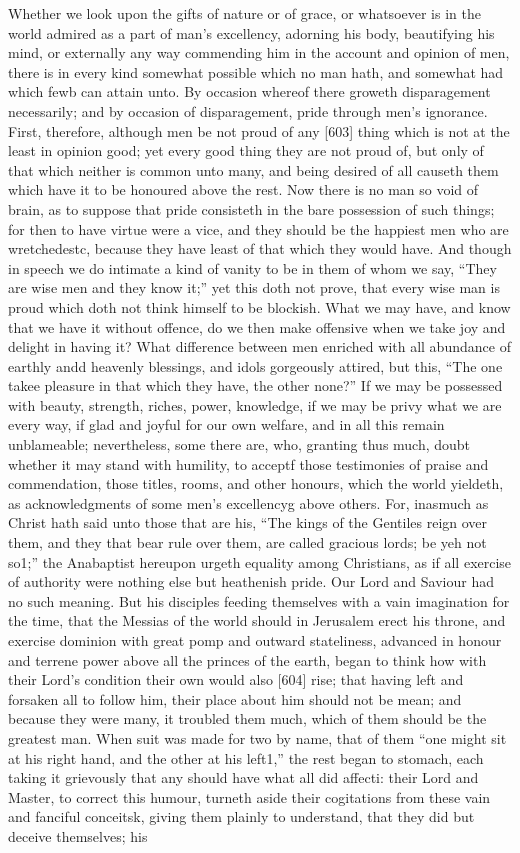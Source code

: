 Whether we look upon the gifts of nature or of grace, or whatsoever is in the world admired as a part of man’s excellency, adorning his body, beautifying his mind, or externally any way commending him in the account and opinion of men, there is in every kind somewhat possible which no man hath, and somewhat had which fewb can attain unto. By occasion whereof there groweth disparagement necessarily; and by occasion of disparagement, pride through men’s ignorance. First, therefore, although men be not proud of any [603] thing which is not at the least in opinion good; yet every good thing they are not proud of, but only of that which neither is common unto many, and being desired of all causeth them which have it to be honoured above the rest. Now there is no man so void of brain, as to suppose that pride consisteth in the bare possession of such things; for then to have virtue were a vice, and they should be the happiest men who are wretchedestc, because they have least of that which they would have. And though in speech we do intimate a kind of vanity to be in them of whom we say, “They are wise men and they know it;” yet this doth not prove, that every wise man is proud which doth not think himself to be blockish. What we may have, and know that we have it without offence, do we then make offensive when we take joy and delight in having it? What difference between men enriched with all abundance of earthly andd heavenly blessings, and idols gorgeously attired, but this, “The one takee pleasure in that which they have, the other none?” If we may be possessed with beauty, strength, riches, power, knowledge, if we may be privy what we are every way, if glad and joyful for our own welfare, and in all this remain unblameable; nevertheless, some there are, who, granting thus much, doubt whether it may stand with humility, to acceptf those testimonies of praise and commendation, those titles, rooms, and other honours, which the world yieldeth, as acknowledgments of some men’s excellencyg above others. For, inasmuch as Christ hath said unto those that are his, “The kings of the Gentiles reign over them, and they that bear rule over them, are called gracious lords; be yeh not so1;” the Anabaptist hereupon urgeth equality among Christians, as if all exercise of authority were nothing else but heathenish pride. Our Lord and Saviour had no such meaning. But his disciples feeding themselves with a vain imagination for the time, that the Messias of the world should in Jerusalem erect his throne, and exercise dominion with great pomp and outward stateliness, advanced in honour and terrene power above all the princes of the earth, began to think how with their Lord’s condition their own would also [604] rise; that having left and forsaken all to follow him, their place about him should not be mean; and because they were many, it troubled them much, which of them should be the greatest man. When suit was made for two by name, that of them “one might sit at his right hand, and the other at his left1,” the rest began to stomach, each taking it grievously that any should have what all did affecti: their Lord and Master, to correct this humour, turneth aside their cogitations from these vain and fanciful conceitsk, giving them plainly to understand, that they did but deceive themselves; his 